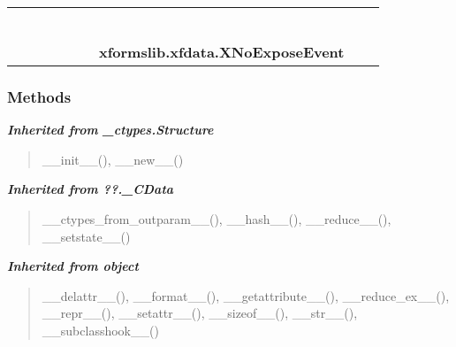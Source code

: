     \label{xformslib:xfdata:XNoExposeEvent}
\begin{tabular}{cccccccccc}
\multicolumn{2}{r}{\settowidth{\BCL}{object}\multirow{2}{\BCL}{object}}
&&
&&
&&
  \\\cline{3-3}
  &&\multicolumn{1}{c|}{}
&&
&&
&&
  \\
\multicolumn{4}{r}{\settowidth{\BCL}{??.\_CData}\multirow{2}{\BCL}{??.\_CData}}
&&
&&
  \\\cline{5-5}
  &&&&\multicolumn{1}{c|}{}
&&
&&
  \\
\multicolumn{6}{r}{\settowidth{\BCL}{\_ctypes.Structure}\multirow{2}{\BCL}{\_ctypes.Structure}}
&&
  \\\cline{7-7}
  &&&&&&\multicolumn{1}{c|}{}
&&
  \\
&&&&&&\multicolumn{2}{l}{\textbf{xformslib.xfdata.XNoExposeEvent}}
\end{tabular}



  \subsubsection{Methods}


\large{\textbf{\textit{Inherited from \_ctypes.Structure}}}

\begin{quote}
\_\_init\_\_(), \_\_new\_\_()
\end{quote}

\large{\textbf{\textit{Inherited from ??.\_CData}}}

\begin{quote}
\_\_ctypes\_from\_outparam\_\_(), \_\_hash\_\_(), \_\_reduce\_\_(), \_\_setstate\_\_()
\end{quote}

\large{\textbf{\textit{Inherited from object}}}

\begin{quote}
\_\_delattr\_\_(), \_\_format\_\_(), \_\_getattribute\_\_(), \_\_reduce\_ex\_\_(), \_\_repr\_\_(), \_\_setattr\_\_(), \_\_sizeof\_\_(), \_\_str\_\_(), \_\_subclasshook\_\_()
\end{quote}

